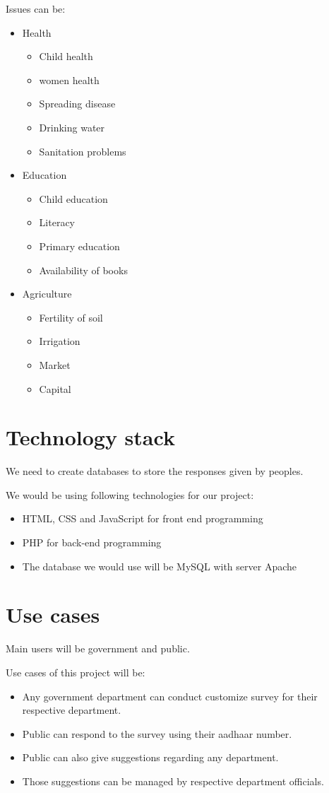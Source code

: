 \documentclass{sig-alternate}
\begin{document}
Issues can be:

\begin{itemize}
\item Health
\begin{itemize}
    \item Child health
    \item women health
    \item Spreading disease
    \item Drinking water
    \item Sanitation problems
\end{itemize}

\item Education
\begin{itemize}
    \item Child education
    \item Literacy
    \item Primary education
    \item Availability of books
\end{itemize}

\item Agriculture
\begin{itemize}
    \item Fertility of soil
    \item Irrigation
    \item Market
    \item Capital
\end{itemize}
\end{itemize}

\section{Technology stack}
We need to create databases to store the responses given by peoples.

We would be using following technologies for our project:
\begin{itemize}
\item  HTML, CSS and JavaScript for front end programming 
\item  PHP for back-end programming
\item  The database we would use will be MySQL with server Apache 
\end{itemize}


\section{Use cases}
Main users will be government and public. 

Use cases of this project will be:
\begin{itemize}
\item  Any government department can conduct customize survey for their respective department.
\item  Public can respond to the survey using their aadhaar number.
\item  Public can also give suggestions regarding any department.
\item Those suggestions can be managed by respective department officials.
\end{itemize}
\end{document}
